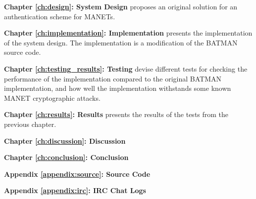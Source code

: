 \textbf{Chapter \ref{ch:design}: System Design} proposes an original solution
for an authentication scheme for \acp{MANET}.

\textbf{Chapter \ref{ch:implementation}: Implementation} presents the
implementation of the system design. The implementation is a modification of the
\ac{BATMAN} source code.

\textbf{Chapter \ref{ch:testing_results}: Testing} devise different tests for checking
the performance of the implementation compared to the original \ac{BATMAN}
implementation, and how well the implementation withstands some known \ac{MANET}
cryptographic attacks.

\textbf{Chapter \ref{ch:results}: Results} presents the results of the tests
from the previous chapter.

\textbf{Chapter \ref{ch:discussion}: Discussion}

\textbf{Chapter \ref{ch:conclusion}: Conclusion}

\textbf{Appendix \ref{appendix:source}: Source Code}

\textbf{Appendix \ref{appendix:irc}: IRC Chat Logs}